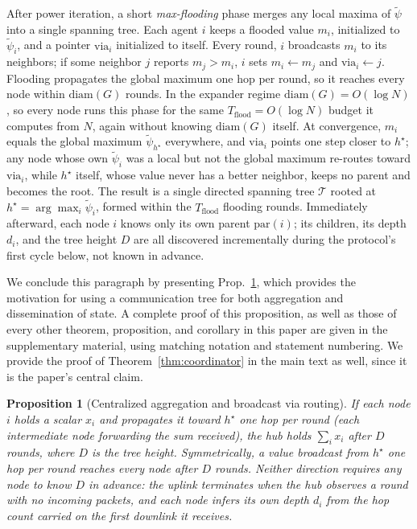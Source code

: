 \documentclass[letterpaper]{article} %
\newtheorem{proposition}{Proposition}
\begin{document}
After power iteration, a short \emph{max-flooding} phase merges any local
maxima of $\tilde\psi$ into a single spanning tree. Each agent $i$ keeps a
flooded value $m_i$, initialized to $\tilde\psi_i$, and a pointer
$\mathrm{via}_i$ initialized to itself. Every round, $i$ broadcasts $m_i$ to
its neighbors; if some neighbor $j$ reports $m_j > m_i$, $i$ sets $m_i
\leftarrow m_j$ and $\mathrm{via}_i \leftarrow j$. Flooding propagates the
global maximum one hop per round, so it reaches every node within
$\mathrm{diam}(G)$ rounds. In the expander regime $\mathrm{diam}(G) = O(\log
N)$ \citep{mohar1991}, so every node runs this phase for the same
$T_{\mathrm{flood}} = O(\log N)$ budget it computes from $N$, again without
knowing $\mathrm{diam}(G)$ itself. At convergence, $m_i$ equals the global
maximum $\tilde\psi_{h^\star}$ everywhere, and $\mathrm{via}_i$ points one step
closer to $h^\star$; any node whose own $\tilde\psi_i$ was a local but not the
global maximum re-routes toward $\mathrm{via}_i$, while $h^\star$ itself, whose
value never has a better neighbor, keeps no parent and becomes the root. The
result is a single directed spanning tree $\mathcal{T}$ rooted at $h^\star =
\arg\max_i \tilde\psi_i$, formed within the $T_{\mathrm{flood}}$ flooding
rounds. Immediately afterward, each node $i$ knows only its own parent
$\mathrm{par}(i)$; its children, its depth $d_i$, and the tree height $D$ are
all discovered incrementally during the protocol's first cycle below, not known
in advance.

We conclude this paragraph by presenting Prop.~\ref{prop:aggbcast}, which
provides the motivation for using a communication tree for both aggregation and
dissemination of state. A complete proof of this proposition, as well as those
of every other theorem, proposition, and corollary in this paper are given in
the supplementary material, using matching notation and statement numbering.
We provide the proof of Theorem~\ref{thm:coordinator} in the main text as
well, since it is the paper's central claim.

\begin{proposition}[Centralized aggregation and broadcast via routing]
\label{prop:aggbcast}
If each node $i$ holds a scalar $x_i$ and propagates it toward $h^\star$ one
	hop per round (each intermediate node forwarding the sum received), the hub
	holds $\sum_i x_i$ after $D$ rounds, where $D$ is the tree height.
	Symmetrically, a value broadcast from $h^\star$ one hop per round reaches
	every node after $D$ rounds. Neither direction requires any node to know
	$D$ in advance: the uplink terminates when the hub observes a round with no
	incoming packets, and each node infers its own depth $d_i$ from the hop
	count carried on the first downlink it receives.
\end{proposition}
\end{document}
